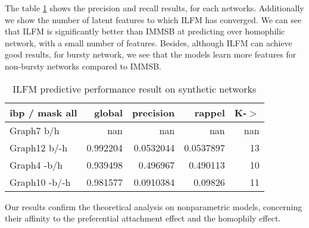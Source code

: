 The table \ref{table:ibp} shows the precision and recall results, for each networks. Additionally we show the number of latent features to which ILFM has converged. We can see that ILFM is significantly better than IMMSB at predicting over homophilic network, with a small number of features. Besides, although ILFM can achieve good results, for bursty network, we see that the models learn more features for non-bursty networks compared to IMMSB. 

\begin{table} \label{table:ibp}
\begin{tabular}{lrrrr}
\hline
 ibp / mask all   &     global &   precision &      rappel &   K-\ensuremath{>} \\
\hline
 Graph7 b/h       & nan        & nan         & nan         &   nan \\
 Graph12 b/-h     &   0.992204 &   0.0532044 &   0.0537897 &    13 \\
 Graph4 -b/h      &   0.939498 &   0.496967  &   0.490113  &    10 \\
 Graph10 -b/-h    &   0.981577 &   0.0910384 &   0.09826   &    11 \\
\hline
\end{tabular}  
    \caption{ILFM predictive performance result on synthetic networks}
\end{table}

Our results confirm the theoretical analysis on nonparametric models, concerning their affinity to the preferential attachment effect and the homophily effect.
%
%
%	
%
%

\clearpage
